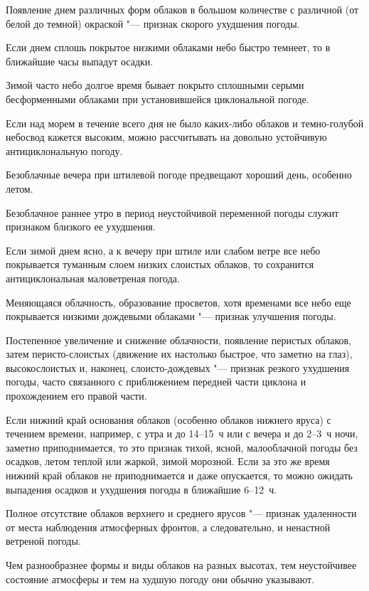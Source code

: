  Появление днем различных форм облаков в большом количестве с
различной (от белой до темной) окраской "--- признак скорого ухудшения
погоды.

 Если днем сплошь покрытое низкими облаками небо быстро темнеет,
то в ближайшие часы выпадут осадки.

 Зимой часто небо долгое время бывает покрыто сплошными серыми
бесформенными облаками при установившейся циклональной погоде.

 Если над морем в течение всего дня не было каких-либо облаков и
темно-голубой небосвод кажется высоким, можно рассчитывать на довольно
устойчивую антициклональную погоду.

 Безоблачные вечера при штилевой погоде предвещают хороший день,
особенно летом.

 Безоблачное раннее утро в период неустойчивой переменной погоды
служит признаком близкого ее ухудшения.

 Если зимой днем ясно, а к вечеру при штиле или слабом ветре все
небо покрывается туманным слоем низких слоистых облаков, то сохранится
антициклональная маловетреная погода.

 Меняющаяся облачность, образование просветов, хотя временами
все небо еще покрывается низкими дождевыми облаками "--- признак
улучшения погоды.

 Постепенное увеличение и снижение облачности, появление
перистых облаков, затем перисто-слоистых (движение их настолько
быстрое, что заметно на глаз), высокослоистых и, наконец,
слоисто-дождевых "--- признак резкого ухудшения погоды, часто
связанного с приближением передней части циклона и прохождением его
правой части.

 Если нижний край основания облаков (особенно облаков нижнего
яруса) с течением времени, например, с утра и до 14--15~ч или с вечера
и до 2--3~ч ночи, заметно приподнимается, то это признак тихой, ясной,
малооблачной погоды без осадков, летом теплой или жаркой, зимой
морозной. Если за это же время нижний край облаков не приподнимается и
даже опускается, то можно ожидать выпадения осадков и ухудшения погоды
в ближайшие 6--12~ч.

 Полное отсутствие облаков верхнего и среднего ярусов "--- признак
удаленности от места наблюдения атмосферных фронтов, а следовательно,
и ненастной ветреной погоды.

 Чем разнообразнее формы и виды облаков на разных высотах, тем
неустойчивее состояние атмосферы и тем на худшую погоду они обычно
указывают.

